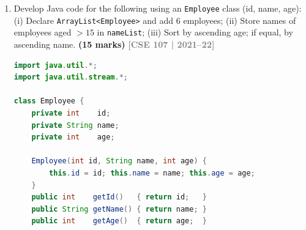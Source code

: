 \documentclass[12pt,a3paper]{article}
\newcommand{\yr}[1]{\hfill\textcolor{gray}{\small\textbf{[#1]}}}
\newcommand{\mk}[1]{\textcolor{orange!70!black}{\small\textbf{(#1 marks)}}}
\begin{document}
\begin{enumerate}
\begin{tcolorbox}[enhanced,breakable,ansbox,
  colback=cH!4,colframe=cH,boxrule=0.8pt,arc=5pt,
  title={\textbf{Answer — Employee Stream Rewrite and
  Sort}},
  fonttitle=\bfseries\color{white},colbacktitle=cH]
\begin{lstlisting}[language=Java]
        System.out.println("All names: " + names2);

        // -- Segment 2 (original for-each loop) -----------
        List<Employee> filtered1 = new ArrayList<>();
        for (Employee e : list)
            if (e.getAge() <= 20) filtered1.add(e);

        // (ii-b) Segment 2 using Stream
        List<Employee> filtered2 = list.stream()
            .filter(e -> e.getAge() <= 20)
            .collect(Collectors.toList());

        System.out.println("Age <= 20: " + filtered2);

        // (iii) Sort: ascending age, then ascending name
        list.sort(Comparator.comparingInt(Employee::getAge)
                            .thenComparing(Employee::getName));

        System.out.println("Sorted: " + list);
    }
}
\end{lstlisting}

\textbf{Output:}
\begin{verbatim}
All names: [Alice, Bob, Carol, Dave, Eve, Frank]
Age <= 20: [Bob, Carol, Dave, Eve]
Sorted: [5:Eve(17), 2:Bob(19), 3:Carol(20), 4:Dave(20),
         1:Alice(22), 6:Frank(25)]
\end{verbatim}

\end{tcolorbox}


\item Develop Java code for the following using an \texttt{Employee} class (id, name, age): (i) Declare \texttt{ArrayList<Employee>} and add 6 employees; (ii) Store names of employees aged $> 15$ in \texttt{nameList}; (iii) Sort by ascending age; if equal, by ascending name. \mk{15}
\yr{CSE 107 | 2021--22}

\begin{tcolorbox}[enhanced,breakable,ansbox,
  colback=cH!4,colframe=cH,boxrule=0.8pt,arc=5pt,
  title={\textbf{Answer — Employee ArrayList, Filter
  and Sort}},
  fonttitle=\bfseries\color{white},colbacktitle=cH]

\begin{lstlisting}[language=Java]
import java.util.*;
import java.util.stream.*;

class Employee {
    private int    id;
    private String name;
    private int    age;

    Employee(int id, String name, int age) {
        this.id = id; this.name = name; this.age = age;
    }
    public int    getId()   { return id;   }
    public String getName() { return name; }
    public int    getAge()  { return age;  }


\end{lstlisting}
\end{tcolorbox}
\end{enumerate}
\end{document}
